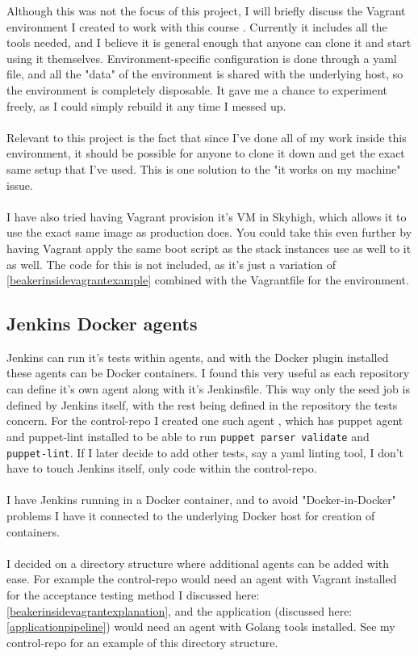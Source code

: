 Although this was not the focus of this project, I will briefly discuss the Vagrant environment I created to work with this course \cite{tholok97vagrantvm}. Currently it includes all the tools needed, and I believe it is general enough that anyone can clone it and start using it themselves. Environment-specific configuration is done through a yaml file, and all the "data" of the environment is shared with the underlying host, so the environment is completely disposable. It gave me a chance to experiment freely, as I could simply rebuild it any time I messed up.
\\
\\
Relevant to this project is the fact that since I've done all of my work inside this environment, it should be possible for anyone to clone it down and get the exact same setup that I've used. This is one solution to the "it works on my machine" issue. 
\\
\\
I have also tried having Vagrant provision it's VM in Skyhigh, which allows it to use the exact same image as production does. You could take this even further by having Vagrant apply the same boot script as the stack instances use as well to it as well. The code for this is not included, as it's just a variation of \ref{beakerinsidevagrantexample} combined with the Vagrantfile for the environment.

\subsection{Jenkins Docker agents}

Jenkins can run it's tests within agents, and with the Docker plugin installed these agents can be Docker containers. I found this very useful as each repository can define it's own agent along with it's Jenkinsfile. This way only the seed job is defined by Jenkins itself, with the rest being defined in the repository the tests concern. For the control-repo I created one such agent \cite{imt3005projectcicd}, which has puppet agent and puppet-lint installed to be able to run \texttt{puppet parser validate} and \texttt{puppet-lint}. If I later decide to add other tests, say a yaml linting tool, I don't have to touch Jenkins itself, only code within the control-repo.
\\
\\
I have Jenkins running in a Docker container, and to avoid "Docker-in-Docker" problems I have it connected to the underlying Docker host for creation of containers. \cite{dockerindockerarticle}
\\
\\
I decided on a directory structure where additional agents can be added with ease. For example the control-repo would need an agent with Vagrant installed for the acceptance testing method I discussed here: \ref{beakerinsidevagrantexplanation}, and the application (discussed here: \ref{applicationpipeline}) would need an agent with Golang tools installed. See my control-repo \cite{imt3005projectcicd} for an example of this directory structure.



